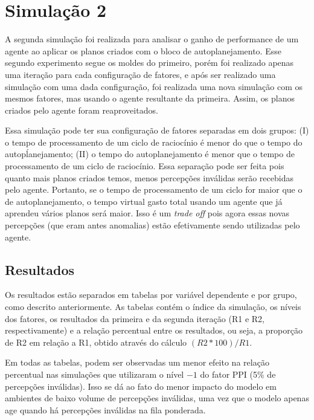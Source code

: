 
\section{Simulação 2}

A segunda simulação foi realizada para analisar o ganho de performance de um agente ao aplicar os planos criados com o bloco de autoplanejamento. Esse segundo experimento segue os moldes do primeiro, porém foi realizado apenas uma iteração para cada configuração de fatores, e após ser realizado uma simulação com uma dada configuração, foi realizada uma nova simulação com os mesmos fatores, mas usando o agente resultante da primeira. Assim, os planos criados pelo agente foram reaproveitados.

Essa simulação pode ter sua configuração de fatores separadas em dois grupos: (I) o tempo de processamento de um ciclo de raciocínio é menor do que o tempo do autopĺanejamento; (II) o tempo do autoplanejamento é menor que o tempo de processamento de um ciclo de raciocínio. Essa separação pode ser feita pois quanto mais planos criados temos, menos percepções inválidas serão recebidas pelo agente. Portanto, se o tempo de processamento de um ciclo for maior que o de autoplanejamento, o tempo virtual gasto total usando um agente que já aprendeu vários planos será maior. Isso é um \textit{trade off} pois agora essas novas
percepções (que eram antes anomalias) estão efetivamente sendo utilizadas pelo agente.

\subsection{Resultados}

Os resultados estão separados em tabelas por variável dependente e por grupo, como descrito anteriormente. As tabelas contém o índice da simulação, os níveis dos fatores, os resultados da primeira e da segunda iteração (R1 e R2, respectivamente) e a relação percentual entre os resultados, ou seja, a proporção de R2 em relação a R1, obtido através do cálculo $(R2 * 100) / R1$.

Em todas as tabelas, podem ser observadas um menor efeito na relação percentual nas simulações que utilizaram o nível $-1$ do fator PPI (5\% de percepções inválidas). Isso se dá ao fato do menor impacto do modelo em ambientes de baixo volume de percepções inválidas, uma vez que o modelo apenas age quando há percepções inválidas na fila ponderada.

